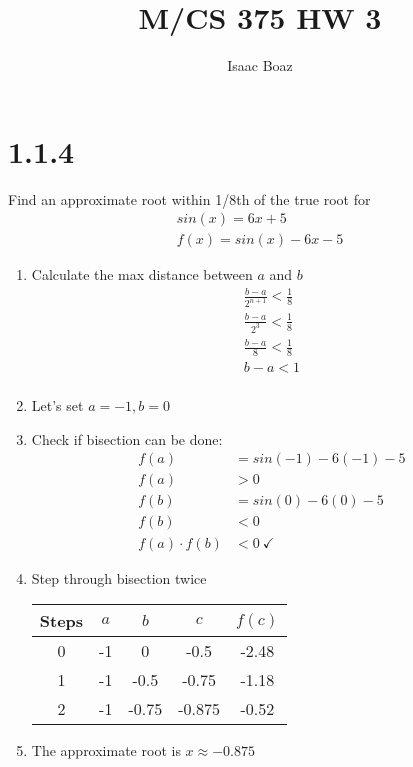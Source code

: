 \documentclass{article}
\title{\vspace{-5ex}M/CS 375 HW 3}
\author{Isaac Boaz}
\begin{document}
\maketitle

\section*{1.1.4}
Find an approximate root within 1/8th of the true root for
\begin{align*}
    sin(x) = 6x + 5 \\
    f(x) = sin(x) - 6x - 5
\end{align*}

\begin{enumerate}
    \item Calculate the max distance between \(a\) and \(b\)
          \begin{align*}
              \frac{b-a}{2^{n+1}} < \frac{1}{8} \\
              \frac{b-a}{2^3} < \frac{1}{8}     \\
              \frac{b-a}{8} < \frac{1}{8}       \\
              b - a < 1                         \\
          \end{align*}
    \item Let's set \(a = -1, b = 0\)
    \item Check if bisection can be done:
          \begin{align*}
              f(a)            & = sin(-1) - 6(-1) - 5 \\
              f(a)            & > 0                   \\
              f(b)            & = sin(0) - 6(0) - 5   \\
              f(b)            & < 0                   \\
              f(a) \cdot f(b) & < 0\ \checkmark
          \end{align*}
    \item Step through bisection twice
          \begin{center}
              \begin{tabular}{c|c|c|c|c}
                  Steps & \(a\) & \(b\) & \(c\)  & \(f(c)\) \\
                  \hline
                  0     & -1    & 0     & -0.5   & -2.48    \\
                  1     & -1    & -0.5  & -0.75  & -1.18    \\
                  2     & -1    & -0.75 & -0.875 & -0.52    \\
              \end{tabular}
          \end{center}
    \item The approximate root is \(x \approx -0.875\)
\end{enumerate}
\end{document}
